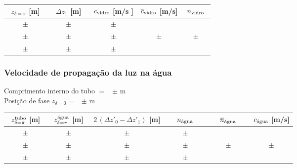 \documentclass[a4paper,12pt]{article}  %
\begin{document}
\begin{center}
	\begin{tabular}{|c|c|c|c|c|}
	\hline
	 $z_{\delta=\pi}$  [m]    &  $\Delta z_1$ [m] & \quad $c_{\textup{vidro}}$  [m/s \quad ]& \quad  $\overline{c}_{\textup{vidro}}$ [m/s]	\quad  &\quad\quad   $n_{\textup{vidro}}$ \quad\quad   \\
	\hline \hline
	  $ \quad\quad \pm \quad\quad $ &  $ \quad\quad \pm \quad\quad $ & $ \quad \pm \quad $ &  & \\ \cline{1-3}
	  $ \quad\quad \pm \quad\quad $ &  $ \quad\quad \pm \quad\quad $ & $ \quad \pm \quad$ & $ \quad \pm \quad$  & $ \quad \pm \quad$ \\ \cline{1-3}
	  $ \quad\quad \pm \quad\quad $ &  $ \quad\quad \pm \quad\quad $ & $ \quad \pm \quad $ &  & \\ \hline
			\end{tabular}
\end{center}



\subsubsection{\sf Velocidade de propagação da luz na água}\label{sec:dados_vid}

\noindent Comprimento interno do tubo $=$~\underline{\makebox[1cm][r]{~}} $\pm$ \underline{\makebox[1cm][r]{~}} m\\
\noindent  Posição de fase $z_{\delta=0}=$~\underline{\makebox[1cm][r]{~}} $\pm$ \underline{\makebox[1cm][r]{~}} m

\begin{center}
	\begin{tabular}{|c|c|c|c|c|c|}
	\hline
	 $z_{\delta=\pi}^{\textup{tubo}}$  [m]   &  $z_{\delta=\pi}^{\textup{água}}$  [m] & $2\,(\Delta z'_0- \Delta z'_1 )$ [m] & $n_{\textup{água}}$  & $\overline{n}_{\textup{água}}$ & $c_{\textup{água}}$ [m/s]\\
	\hline \hline
	 $ \quad\quad \pm \quad\quad $  & $ \quad\quad \pm \quad\quad $  & $ \pm $ & $ \quad\quad \pm \quad\quad $ &  & \\ \cline{1-4}
	  $ \pm $& $ \quad \pm \quad $ & $ \pm $ & $ \quad \pm \quad$ & $ \quad\quad \pm \quad\quad$  & $ \quad\quad \pm \quad\quad$ \\ \cline{1-4}
	  $ \pm $ & $ \quad \pm \quad $ &  $\pm $ & $ \quad \pm \quad $ &  & \\ \hline
			\end{tabular}
\end{center}
\end{document}

